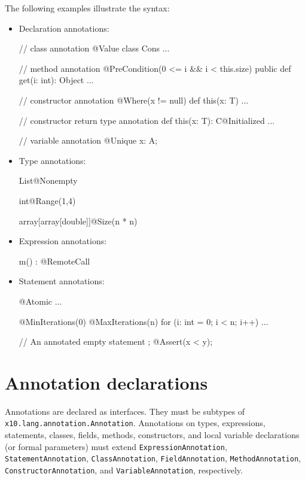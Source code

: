 \noindent
The following examples illustrate the syntax:

\begin{itemize}
\item Declaration annotations:
\begin{xtennoindent}
  // class annotation
  @Value
  class Cons { ... }

  // method annotation
  @PreCondition(0 <= i && i < this.size)
  public def get(i: int): Object { ... }

  // constructor annotation
  @Where(x != null)
  def this(x: T) { ... }

  // constructor return type annotation
  def this(x: T): C@Initialized { ... }

  // variable annotation
  @Unique x: A;
\end{xtennoindent}
\item Type annotations:
\begin{xtennoindent}
  List@Nonempty

  int@Range(1,4)

  array[array[double]]@Size(n * n)
\end{xtennoindent}
\item Expression annotations:
\begin{xtennoindent}
  m() : @RemoteCall
\end{xtennoindent}
\item Statement annotations:
\begin{xtennoindent}
  @Atomic { ... }

  @MinIterations(0)
  @MaxIterations(n)
  for (i: int = 0; i < n; i++) { ... }

  // An annotated empty statement ;
  @Assert(x < y);
\end{xtennoindent}
\end{itemize}

\section{Annotation declarations}

Annotations are declared as interfaces.  They must be
subtypes of \texttt{x10.lang.annotation.Annotation}.
Annotations on types, expressions, statements, classes, fields,
methods, constructors, and local variable declarations (or
formal parameters)
must extend
\texttt{ExpressionAnnotation},
\texttt{StatementAnnotation},
\texttt{ClassAnnotation},
\texttt{FieldAnnotation},
\texttt{MethodAnnotation},
\texttt{ConstructorAnnotation}, and
\texttt{VariableAnnotation}, respectively.

